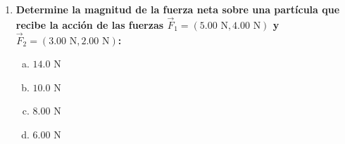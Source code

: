 \documentclass[11pt,a4paper]{article}
\begin{document}
\begin{enumerate}
    \item \textbf{Determine la magnitud de la fuerza neta sobre una partícula que recibe la acción de las fuerzas $\vec{F}_1 = (5.00 \text{ N}, 4.00 \text{ N})$ y $\vec{F}_2 = (3.00 \text{ N}, 2.00 \text{ N})$:}
    \begin{enumerate}[a)]
        \item $14.0 \text{ N}$
        \item $10.0 \text{ N}$
        \item $8.00 \text{ N}$
        \item $6.00 \text{ N}$
    \end{enumerate}

\end{enumerate}
\end{document}
